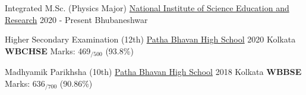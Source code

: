


\cvevent
{Integrated M.Sc. (Physics Major)}
{\href{https://www.niser.ac.in/}{National Institute of Science Education and Research}}
{2020 - Present}
{Bhubaneshwar}

\divider

\cvevent
{Higher Secondary Examination (12th)}
{\href{https://pathabhavan.org/}{Patha Bhavan High School}}
{2020}
{Kolkata}
\textbf{WBCHSE} Marks: 469$_{/500}$ (93.8\%)

\divider

\cvevent
{Madhyamik Parikhsha (10th)}
{\href{https://pathabhavan.org/}{Patha Bhavan High School}}
{2018}
{Kolkata}
\textbf{WBBSE} Marks: 636$_{/700}$ (90.86\%)

